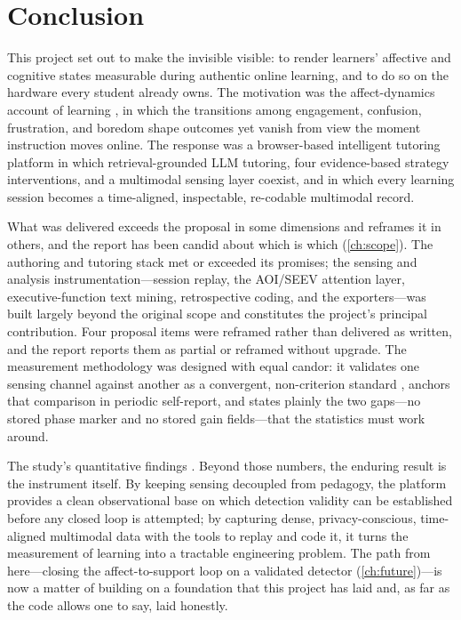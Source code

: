 \chapter{Conclusion}
\label{ch:conclusion}


This project set out to make the invisible visible: to render learners'
affective and cognitive states measurable during authentic online
learning, and to do so on the hardware every student already owns. The
motivation was the affect-dynamics account of learning
\citep{dmello2012dynamics, baker2010better}, in which the transitions
among engagement, confusion, frustration, and boredom shape outcomes yet
vanish from view the moment instruction moves online. The response was a
browser-based intelligent tutoring platform in which retrieval-grounded
LLM tutoring, four evidence-based strategy interventions, and a
multimodal sensing layer coexist, and in which every learning session
becomes a time-aligned, inspectable, re-codable multimodal record.

What was delivered exceeds the proposal in some dimensions and reframes it
in others, and the report has been candid about which is which
(\cref{ch:scope}). The authoring and tutoring stack met or exceeded its
promises; the sensing and analysis instrumentation---session replay, the
AOI/SEEV attention layer, executive-function text mining, retrospective
coding, and the exporters---was built largely beyond the original scope
and constitutes the project's principal contribution. Four proposal items
were reframed rather than delivered as written, and the report reports
them as partial or reframed without upgrade. The measurement methodology
was designed with equal candor: it validates one sensing channel against
another as a convergent, non-criterion standard
\citep{campbell1959}, anchors that comparison in periodic self-report, and
states plainly the two gaps---no stored phase marker and no stored gain
fields---that the statistics must work around.

The study's quantitative findings . Beyond those numbers, the enduring result is the instrument
itself. By keeping sensing decoupled from pedagogy, the platform provides
a clean observational base on which detection validity can be established
before any closed loop is attempted; by capturing dense, privacy-conscious,
time-aligned multimodal data with the tools to replay and code it, it
turns the measurement of learning into a tractable engineering problem.
The path from here---closing the affect-to-support loop on a validated
detector (\cref{ch:future})---is now a matter of building on a foundation
that this project has laid and, as far as the code allows one to say,
laid honestly.

